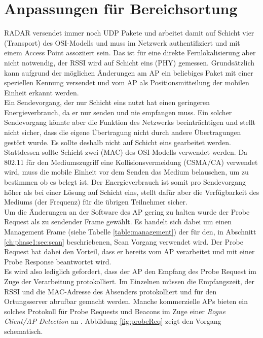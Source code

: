 \section{Anpassungen für Bereichsortung}
\label{ch:phase2:sec:anpassungbereich}
RADAR versendet immer noch UDP Pakete und arbeitet damit auf Schicht vier (Transport) des OSI-Modells und muss im Netzwerk authentifiziert und mit einem Access Point assoziiert sein.
Das ist für eine direkte Fernlokalisierung aber nicht notwendig, der RSSI wird auf Schicht eins (PHY) gemessen.
Grundsätzlich kann aufgrund der möglichen Änderungen am AP ein beliebiges Paket mit einer speziellen Kennung versendet und vom AP als Positionsmitteilung der mobilen Einheit erkannt werden. \\
Ein Sendevorgang, der nur Schicht eins nutzt hat einen geringeren Energieverbrauch, da er nur senden und nie empfangen muss.
Ein solcher Sendevorgang könnte aber die Funktion des Netzwerks beeinträchtigen und stellt nicht sicher, dass die eigene Übertragung nicht durch andere Übertragungen gestört wurde.
Es sollte deshalb nicht auf Schicht eins gearbeitet werden.\\
Stattdessen sollte Schicht zwei (MAC) des OSI-Modells verwendet werden. 
Da 802.11 für den Mediumszugriff eine Kollisionsvermeidung (CSMA/CA) verwendet wird, muss die mobile Einheit vor dem Senden das Medium belauschen, um zu bestimmen ob es belegt ist.
Der Energieverbrauch ist somit pro Sendevorgang höher als bei einer Lösung auf Schicht eins, stellt dafür aber die Verfügbarkeit des Mediums (der Frequenz) für die übrigen Teilnehmer sicher. \\
Um die Änderungen an der Software des AP gering zu halten wurde der Probe Request als zu sendender Frame gewählt.
Es handelt sich dabei um einen Management Frame (siehe Tabelle \ref{table:management}) der für den, in Abschnitt \ref{ch:phase1:sec:scan} beschriebenen, Scan Vorgang verwendet wird.
Der Probe Request hat dabei den Vorteil, dass er bereits vom AP verarbeitet und mit einer Probe Response beantwortet wird. \\
Es wird also lediglich gefordert, dass der AP den Empfang des Probe Request im Zuge der Verarbeitung protokolliert. 
Im Einzelnen müssen die Empfangszeit, der RSSI und die MAC-Adresse des Absenders protokolliert und für den Ortungsserver abrufbar gemacht werden. 
Manche kommerzielle APs bieten ein solches Protokoll für Probe Requests und Beacons im Zuge einer \textit{Rogue Client/AP Detection} an \cite{lancom2017rouge}.
Abbildung \ref{fig:probeReq} zeigt den Vorgang schematisch.\\

